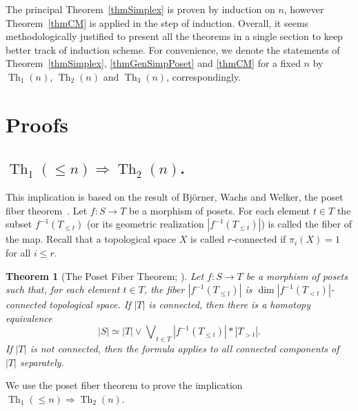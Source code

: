 \documentclass[english,12pt,oneside]{amsproc}
\DeclareMathOperator{\Th}{Th}
\newcounter{stmcounter}[section]
\numberwithin{equation}{section}
\theoremstyle{plain}
\newtheorem{thm}[stmcounter]{Theorem}
\theoremstyle{definition}
\theoremstyle{remark}
\begin{document}
The principal Theorem~\ref{thmSimplex} is proven by induction on $n$, however Theorem~\ref{thmCM} is applied in the step of induction. Overall, it seems methodologically justified to present all the theorems in a single section to keep better track of induction scheme. For convenience, we denote the statements of Theorem~\ref{thmSimplex}, \ref{thmGenSimpPoset} and \ref{thmCM} for a fixed $n$ by $\Th_1(n)$, $\Th_2(n)$  and  $\Th_3(n)$, correspondingly.


\section{Proofs}\label{secProofs}

\subsection{$\Th_1(\leqslant n)\Rightarrow\Th_2(n)$.}

This implication is based on the result of Bj\"{o}rner, Wachs and Welker, the poset fiber theorem~\cite{BjWW}. Let $f\colon S\to T$ be a morphism of posets. For each element $t\in T$ the subset $f^{-1}(T_{\leqslant t})$ (or its geometric realization $|f^{-1}(T_{\leqslant t})|$) is called the fiber of the map. Recall that a topological space $X$ is called $r$-connected if $\pi_i(X)=1$ for all $i\leqslant r$.

\begin{thm}[{The Poset Fiber Theorem; \cite[Thm.1.1]{BjWW}}]\label{thmFiberThm}
Let $f\colon S\to T$ be a morphism of posets such that, for each element $t\in T$, the fiber $|f^{-1}(T_{\leqslant t})|$ is $\dim |f^{-1}(T_{<t})|$-connected topological space. If $|T|$ is connected, then there is a homotopy equivalence
\begin{equation}\label{eqWedgeGeneral}
|S|\simeq |T|\vee\bigvee\nolimits_{t\in T} |f^{-1}(T_{\leqslant t})|\ast |T_{>t}|.
\end{equation}
If $|T|$ is not connected, then the formula applies to all connected components of $|T|$ separately.
\end{thm}

We use the poset fiber theorem to prove the implication $\Th_1(\leqslant n)\Rightarrow\Th_2(n)$.
\end{document}
